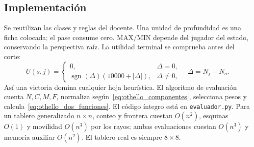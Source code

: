 \subsection{Implementación}
Se reutilizan las clases y reglas del docente. Una unidad de profundidad es una ficha colocada; el pase consume cero. MAX/MIN depende del jugador del estado, conservando la perspectiva raíz. La utilidad terminal se comprueba antes del corte:
\begin{equation}
 U(s,j)=\begin{cases}0,&\Delta=0,\\
 \operatorname{sgn}(\Delta)(10000+|\Delta|),&\Delta\neq0,
 \end{cases}\quad\Delta=N_j-N_o.
 \label{eq:othello_terminal}
\end{equation}
Así una victoria domina cualquier hoja heurística. El algoritmo de evaluación cuenta $N,C,M,F$, normaliza según~\eqref{eq:othello_componentes}, selecciona pesos y calcula~\eqref{eq:othello_dos_funciones}. El código íntegro está en \texttt{evaluador.py}. Para un tablero generalizado $n\times n$, conteo y frontera cuestan $O(n^2)$, esquinas $O(1)$ y movilidad $O(n^3)$ por los rayos; ambas evaluaciones cuestan $O(n^3)$ y memoria auxiliar $O(n^2)$. El tablero real es siempre $8\times8$.

